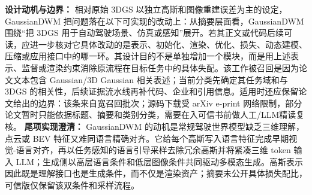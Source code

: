 \textbf{设计动机与边界：} 相对原始 3DGS 以独立高斯和图像重建误差为主的设定，GaussianDWM 把问题落在以下可实现的改动上：从摘要层面看，GaussianDWM 围绕“把 3DGS 用于自动驾驶场景、仿真或感知”展开。若其正文或代码后续可读，应进一步核对它具体改动的是表示、初始化、渲染、优化、损失、动态建模、压缩或应用接口中的哪一环。其设计目的不是单独增加一个模块，而是用上述表示、监督或渲染约束消除原流程在目标任务中的具体失配。该工作被召回是因为论文文本包含 Gaussian/3D Gaussian 相关表述；当前分类先确定其任务域和与 3DGS 的相关性，后续证据流水线再补代码、企业和引用信息。适用时还应保留论文给出的边界：该条来自宽召回批次；源码下载受 arXiv e-print 网络限制，部分论文暂时只能依据标题、摘要和类别分类，需要在入可信书前做人工/LLM精读复核。
\textbf{尾项实现澄清：} GaussianDWM 的动机是常规驾驶世界模型缺乏三维理解，点云或 BEV 特征又难同语言精确对齐。它给每个高斯写入语言特征完成早期视觉-语言对齐，再以任务感知的语言引导采样去除冗余高斯并将紧凑三维 token 输入 LLM；生成侧以高层语言条件和低层图像条件共同驱动多模态生成。高斯表示因此既是理解接口也是生成条件，而不仅是渲染资产；摘要未公开具体损失配比，可信版仅保留该双条件和采样流程。
